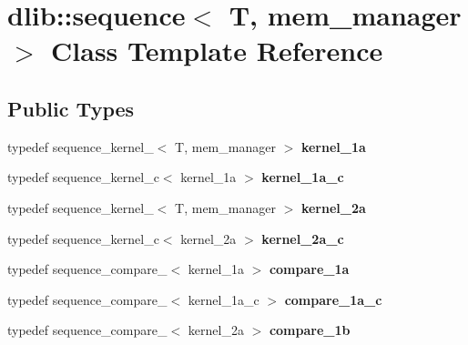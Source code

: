 \hypertarget{classdlib_1_1sequence}{
\section{dlib::sequence$<$ T, mem\_\-manager $>$ Class Template Reference}
\label{classdlib_1_1sequence}
}
\subsection*{Public Types}
\begin{DoxyCompactItemize}
\item 
\hypertarget{classdlib_1_1sequence_a83a44baefff75b4e5d3df967efa7c0bb}{
typedef sequence\_\-kernel\_$<$ T, mem\_\-manager $>$ {\bfseries kernel\_\-1a}}
\label{classdlib_1_1sequence_a83a44baefff75b4e5d3df967efa7c0bb}

\item 
\hypertarget{classdlib_1_1sequence_aa9448ead03cab6dd5f51d3c8ac5e80df}{
typedef sequence\_\-kernel\_\-c$<$ kernel\_\-1a $>$ {\bfseries kernel\_\-1a\_\-c}}
\label{classdlib_1_1sequence_aa9448ead03cab6dd5f51d3c8ac5e80df}

\item 
\hypertarget{classdlib_1_1sequence_a67669652a5977f0ca5abda661ffba98d}{
typedef sequence\_\-kernel\_$<$ T, mem\_\-manager $>$ {\bfseries kernel\_\-2a}}
\label{classdlib_1_1sequence_a67669652a5977f0ca5abda661ffba98d}

\item 
\hypertarget{classdlib_1_1sequence_ab176209b5f05388e59a1957ed55953ba}{
typedef sequence\_\-kernel\_\-c$<$ kernel\_\-2a $>$ {\bfseries kernel\_\-2a\_\-c}}
\label{classdlib_1_1sequence_ab176209b5f05388e59a1957ed55953ba}

\item 
\hypertarget{classdlib_1_1sequence_a651a1c493f1a84277567bbe8d0130124}{
typedef sequence\_\-compare\_$<$ kernel\_\-1a $>$ {\bfseries compare\_\-1a}}
\label{classdlib_1_1sequence_a651a1c493f1a84277567bbe8d0130124}

\item 
\hypertarget{classdlib_1_1sequence_a89570cbe98ccdc7e82b40fb24838ecfb}{
typedef sequence\_\-compare\_$<$ kernel\_\-1a\_\-c $>$ {\bfseries compare\_\-1a\_\-c}}
\label{classdlib_1_1sequence_a89570cbe98ccdc7e82b40fb24838ecfb}

\item 
\hypertarget{classdlib_1_1sequence_a8ba9598bec59c0a8f33163ac4cc4eba7}{
typedef sequence\_\-compare\_$<$ kernel\_\-2a $>$ {\bfseries compare\_\-1b}}
\label{classdlib_1_1sequence_a8ba9598bec59c0a8f33163ac4cc4eba7}


\end{DoxyCompactItemize}
